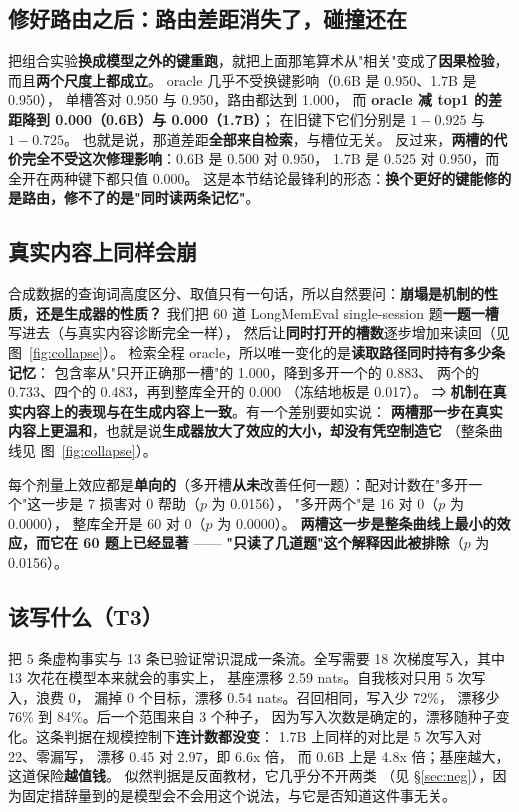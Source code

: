 \documentclass[11pt]{ctexart}
\begin{document}
\subsection{修好路由之后：路由差距消失了，碰撞还在}
把组合实验\textbf{换成模型之外的键重跑}，就把上面那笔算术从"相关"变成了\textbf{因果检验}，而且\textbf{两个尺度上都成立}。
oracle 几乎不受换键影响（0.6B 是 0.950、1.7B 是 0.950），
单槽答对 0.950 与 0.950，路由都达到 1.000，
而 \textbf{oracle 减 top1 的差距降到 0.000（0.6B）与 0.000（1.7B）}；
在旧键下它们分别是 $1-0.925$ 与 $1-0.725$。
也就是说，那道差距\textbf{全部来自检索}，与槽位无关。
反过来，\textbf{两槽的代价完全不受这次修理影响}：0.6B 是 0.500 对 0.950，
1.7B 是 0.525 对 0.950，而全开在两种键下都只值 0.000。
这是本节结论最锋利的形态：\textbf{换个更好的键能修的是路由，修不了的是"同时读两条记忆"}。

\subsection{真实内容上同样会崩}
合成数据的查询词高度区分、取值只有一句话，所以自然要问：\textbf{崩塌是机制的性质，还是生成器的性质？}
我们把 60 道 LongMemEval single-session 题\textbf{一题一槽}写进去（与真实内容诊断完全一样），
然后让\textbf{同时打开的槽数}逐步增加来读回（见 图~\ref{fig:collapse}）。
检索全程 oracle，所以唯一变化的是\textbf{读取路径同时持有多少条记忆}：
包含率从"只开正确那一槽"的 1.000，降到多开一个的 0.883、
两个的 0.733、四个的 0.483，再到整库全开的 0.000
（冻结地板是 0.017）。
⇒ \textbf{机制在真实内容上的表现与在生成内容上一致}。有一个差别要如实说：
\textbf{两槽那一步在真实内容上更温和}，也就是说\textbf{生成器放大了效应的大小，却没有凭空制造它}
（整条曲线见 图~\ref{fig:collapse}）。


每个剂量上效应都是\textbf{单向的}（多开槽\textbf{从未}改善任何一题）：配对计数在"多开一个"这一步是
7 损害对 0 帮助（$p$ 为 0.0156），
"多开两个"是 16 对 0（$p$ 为 0.0000），
整库全开是 60 对 0（$p$ 为 0.0000）。
\textbf{两槽这一步是整条曲线上最小的效应，而它在 60 题上已经显著} ——
\textbf{"只读了几道题"这个解释因此被排除}（$p$ 为 0.0156）。

\subsection{该写什么（T3）}
把 $5$ 条虚构事实与 13 条已验证常识混成一条流。全写需要
18 次梯度写入，其中 13 次花在模型本来就会的事实上，
基座漂移 2.59 nats。自我核对只用 5 次写入，浪费 0，
漏掉 0 个目标，漂移 0.54 nats。召回相同，写入少 72\%，
漂移少 76\% 到 84\%。后一个范围来自 3 个种子，
因为写入次数是确定的，漂移随种子变化。这条判据在规模控制下\textbf{连计数都没变}：
1.7B 上同样的对比是 5 次写入对 22、零漏写，
漂移 0.45 对 2.97，即 6.6x 倍，
而 0.6B 上是 4.8x 倍；基座越大，这道保险\textbf{越值钱}。
似然判据是反面教材，它几乎分不开两类
（见 §\ref{sec:neg}），因为固定措辞量到的是模型会不会用这个说法，与它是否知道这件事无关。
\end{document}
